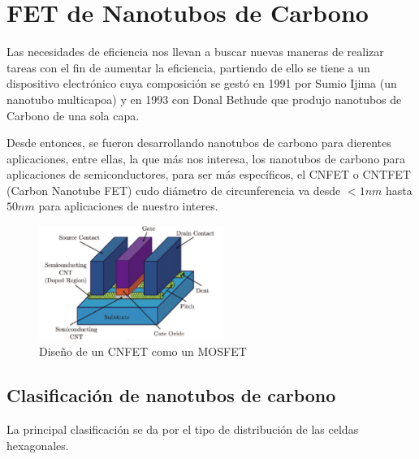 \documentclass[conference]{IEEEtran} %
\begin{document}




	\section{FET de Nanotubos de Carbono}
	
	Las necesidades de eficiencia nos llevan a buscar nuevas maneras de realizar tareas con el fin de aumentar la eficiencia, partiendo de ello se tiene a un dispositivo electrónico cuya composición se gestó en 1991 por Sumio Ijima (un nanotubo multicapoa) y en 1993 con Donal Bethude que produjo nanotubos de Carbono de una sola capa.
	
	Desde entonces, se fueron desarrollando nanotubos de carbono para dierentes aplicaciones, entre ellas, la que más nos interesa, los nanotubos de carbono para aplicaciones de semiconductores, para ser más específicos, el CNFET o CNTFET (Carbon Nanotube FET) cudo diámetro de circunferencia va desde $<1nm$ hasta $50nm$ \cite{DesignandSimulationofCarbon2021} para aplicaciones de nuestro interes.
	
	
	
	\begin{figure}[h!]
		\centering
		\includegraphics[width=6cm]{IMAGENES/img11}
		\caption{Diseño de un CNFET como un MOSFET \cite{DesignofanovelternarySRAM2017}}
		\label{img11}
	\end{figure}
	



	\subsection{Clasificación de nanotubos de carbono}
	
	La principal clasificación se da por el tipo de distribución de las celdas hexagonales.
	
\end{document}
